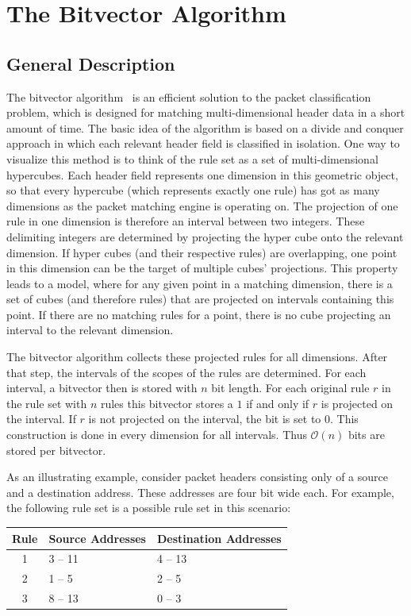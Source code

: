 \documentclass[conference]{IEEEtran}
\begin{document}
\section{The Bitvector Algorithm}
\subsection{General Description}
\label{sec:bv-general}
The bitvector algorithm~\cite{bv} is an efficient solution to the packet 
classification problem, which is designed for matching multi-dimensional header data in a short amount of time.
The basic idea of the algorithm is based on a divide and conquer approach in 
which each relevant header field is classified in isolation.
One way to visualize this method is to think of the rule set as a set of multi-dimensional hypercubes.
Each header field represents one dimension in this geometric object, so 
that every hypercube (which represents exactly one rule) has got as many dimensions as the packet matching engine is operating on.
The projection of one rule in one dimension is therefore an interval between two integers.
These delimiting integers are determined by projecting the hyper cube onto the relevant dimension.
If hyper cubes (and their respective rules) are overlapping, one point in this dimension can be the target of multiple cubes' projections. 
This property leads to a model, where for any given point in a matching
dimension, there is a set of cubes (and therefore rules) that are projected on intervals containing this point.
If there are no matching rules for a point, there is no cube projecting an interval to the relevant dimension.

The bitvector algorithm collects these projected rules for all dimensions.
After that step, the intervals of the scopes of the rules are determined.
For each interval, a bitvector then is stored with $n$ bit length.
For each original rule $r$ in the rule set with $n$ rules this bitvector 
stores a $1$ if and only if $r$ is projected on the interval.
If $r$ is not projected on the interval, the bit is set to $0$.
This construction is done in every dimension for all intervals.
Thus $\mathcal O(n)$ bits are stored per bitvector.

As an illustrating example, consider packet headers consisting only of a source and a destination address.
These addresses are four bit wide each.
For example, the following rule set is a possible rule set in this scenario:

\begin{center}
  \begin{tabularx}{0.48\textwidth}{c|X|X}
  Rule&Source Addresses&Destination Addresses\\
  \hline
  1&3 -- 11&4 -- 13\\
  2&1 -- 5&2 -- 5\\
  3&8 -- 13&0 -- 3\\
  \end{tabularx}
\end{center}
\end{document}
